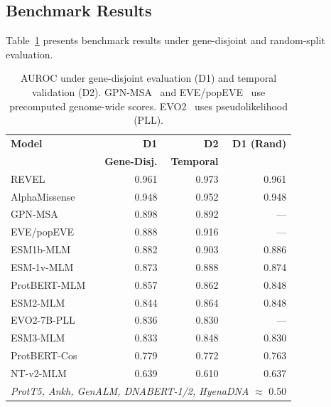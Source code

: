 \documentclass[9pt]{article}
\begin{document}
\subsection{Benchmark Results}

Table~\ref{tab:benchmark} presents benchmark results under gene-disjoint and random-split evaluation.

\begin{table}[h]
\centering
\caption{AUROC under gene-disjoint evaluation (D1) and temporal validation (D2). GPN-MSA~\cite{benegas2025gpn} and EVE/popEVE~\cite{frazer2021eve} use precomputed genome-wide scores. EVO2~\cite{nguyen2025evo2} uses pseudolikelihood (PLL).}
\label{tab:benchmark}
\small
\begin{tabular}{lrrr}
\toprule
\textbf{Model} & \textbf{D1} & \textbf{D2} & \textbf{D1 (Rand)} \\
 & \textbf{Gene-Disj.} & \textbf{Temporal} & \textbf{} \\
\midrule
REVEL & 0.961 & 0.973 & 0.961 \\
AlphaMissense & 0.948 & 0.952 & 0.948 \\
\midrule
GPN-MSA & 0.898 & 0.892 & --- \\
EVE/popEVE & 0.888 & 0.916 & --- \\
ESM1b-MLM & 0.882 & 0.903 & 0.886 \\
ESM-1v-MLM & 0.873 & 0.888 & 0.874 \\
ProtBERT-MLM & 0.857 & 0.862 & 0.848 \\
ESM2-MLM & 0.844 & 0.864 & 0.848 \\
EVO2-7B-PLL & 0.836 & 0.830 & --- \\
ESM3-MLM & 0.833 & 0.848 & 0.830 \\
ProtBERT-Cos & 0.779 & 0.772 & 0.763 \\
NT-v2-MLM & 0.639 & 0.610 & 0.637 \\
\midrule
\multicolumn{4}{l}{\textit{ProtT5, Ankh, GenALM, DNABERT-1/2, HyenaDNA} $\approx$ 0.50} \\
\bottomrule
\end{tabular}
\end{table}
\end{document}

